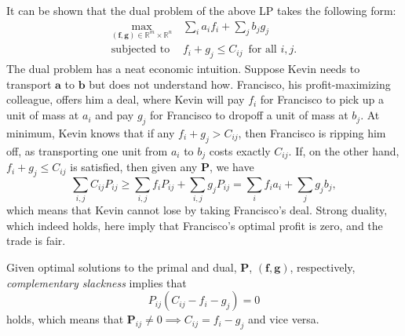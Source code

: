 \documentclass[11pt]{amsart}
\newcommand{\R}{\mathbb{R}}
\renewcommand{\b}{\mathbf}
\theoremstyle{remark}
\begin{document}
    It can be shown that the dual problem of the above LP takes the following
    form: \begin{align*}
    \max_{(\b f, \b g) \in \R^{m} \times \R^n} \, & \sum_i a_i f_i + \sum_j b_j
    g_j
    \\ 
    \text{subjected to } & f_i + g_j \le C_{ij}\, \text{ for all $i,j$}.
    \end{align*}
    The dual problem has a neat economic intuition. Suppose Kevin needs to
    transport $\b a$ to $\b b$ but does not understand how. Francisco, his
    profit-maximizing colleague, offers him a deal, where Kevin will pay $f_i$
    for Francisco to
    pick up a unit of mass at $a_i$ and pay $g_j$ for Francisco to dropoff a
    unit of mass at $b_j.$ At minimum, Kevin knows that if any $f_i + g_j > C_
    {ij}$, then Francisco is ripping him off, as transporting one unit from
    $a_i$ to $b_j$ costs exactly $C_{ij}$. If, on the other hand, $f_i + g_j
    \le C_{ij}$ is satisfied, then given any $\b P$, we have \[
    \sum_{i,j} C_{ij}P_{ij} \ge \sum_{i,j} f_i P_{ij} + \sum_{i,j} g_j P_{ij} =
    \sum_i f_i a_i + \sum_j g_j b_j \tag{Weak duality},
    \]
    which means that Kevin cannot lose by taking Francisco's deal. Strong
    duality, which indeed holds, here imply that Francisco's optimal profit is
    zero, and the trade is fair.
    
    
    Given optimal solutions to the primal and dual, $\b P$, $(\b f, \b g)$,
    respectively, \emph{complementary slackness} implies that \[
    P_{ij} (C_{ij} - f_i - g_j) = 0
    \]
    holds, which means that $\b P_{ij} \neq 0 \implies C_{ij} = f_i - g_j$ and
    vice versa. 



\end{document}
